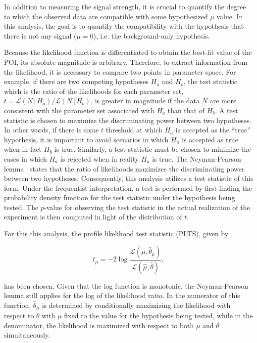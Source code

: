 
In addition to measuring the signal strength, it is crucial to
quantify the degree to which the observed data are compatible with
some hypothesized $\mu$ value. In this analysis, the goal is to
quantify the compatibility with the hypothesis that there is not any
signal ($\mu = 0$), i.e. the background-only hypothesis. 

Because the likelihood function is differentiated to obtain the
best-fit value of the POI, its absolute magnitude is
arbitrary. Therefore, to extract
information from the likelihood, it is necessary to compare two points
in parameter space. For example, if there are two competing hypotheses
$H_a$ and $H_b$, the test statistic which is the ratio of the
likelihoods for each parameter set, $t =
\mathscr{L}(N\,|\,H_a)/\mathscr{L}(N\,|\,H_b)$, is greater in magnitude if the
data $N$ are more consistent with the parameter set associated with
$H_a$ than that of $H_b$. A test statistic is chosen to maximize the
discriminating power between two hypotheses. In other words, if there
is some $t$ threshold at which $H_a$ is accepted as the ``true''
hypothesis, it is important to avoid scenarios in which $H_a$ is
accepted as true when in fact $H_b$ is true. Similarly, a test
statistic must be chosen to minimize the cases in which $H_a$ is
rejected when in reality $H_a$ is true. The Neyman-Pearson
lemma~\cite{bib:neymanp33}
states that the ratio of likelihoods maximizes the discriminating
power between two hypotheses. Consequently, this analysis utilizes a
test statistic of this form. Under the frequentist interpretation, a
test is performed by first finding the probability density function
for the test statistic under the hypothesis being tested. The $p$-value
for observing the test statistic in the actual realization of the
experiment is then computed in light of the distribution of $t$.

For this this analysis, the profile likelihood test statistic (PLTS), given
by

\begin{equation}
t_{\mu} = -2\log{\frac{\mathscr{L}(\mu,\hat{\theta}_{\mu})}{\mathscr{L}(\hat{\mu},\hat{\theta})}},
\label{chapter:statistics:equation:test_statistic}
\end{equation}

\noindent
has been chosen. Given that the log function is monotonic, the
Neyman-Pearson lemma still applies for the log of the likelihood
ratio. In the numerator of this function, $\hat{\theta}_{\mu}$ is
determined by conditionally maximizing the likelihood with respect to
$\theta$ with $\mu$ fixed to the value for the hypothesis being tested, while in the
denominator, the likelihood is maximized with respect to both $\mu$
and $\theta$ simultaneously. 

